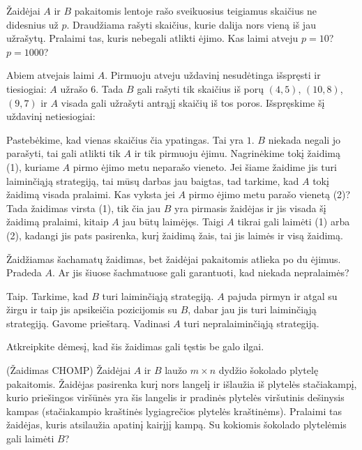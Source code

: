 \begin{pavnr}
  Žaidėjai $A$ ir $B$ pakaitomis lentoje rašo sveikuosius teigiamus skaičius
  ne didesnius už $p$. Draudžiama rašyti skaičius, kurie dalija nors vieną iš
  jau užrašytų. Pralaimi tas, kuris nebegali atlikti ėjimo. Kas laimi atveju
  $p=10$? $p=1000$?
\end{pavnr}

\begin{sprendimas}
  Abiem atvejais laimi $A$. Pirmuoju atveju uždavinį nesudėtinga išspręsti
  ir tiesiogiai: $A$ užrašo $6$. Tada $B$ gali rašyti tik skaičius iš porų
  $(4,5)$, $(10,8)$, $(9,7)$ ir $A$ visada gali užrašyti antrąjį skaičių iš
  tos poros. Išspręskime šį uždavinį netiesiogiai:

  Pastebėkime, kad vienas skaičius čia ypatingas. Tai yra
  $1$. $B$ niekada negali jo parašyti, tai gali atlikti tik $A$ ir tik
  pirmuoju ėjimu. Nagrinėkime tokį žaidimą (1), kuriame $A$ pirmo ėjimo metu
  neparašo vieneto. Jei šiame žaidime jis turi laiminčiąją strategiją, tai
  mūsų darbas jau baigtas, tad tarkime, kad $A$ tokį žaidimą visada pralaimi.
  Kas vyksta jei $A$ pirmo ėjimo metu parašo vienetą (2)? Tada žaidimas virsta
  (1), tik čia jau $B$ yra pirmasis žaidėjas ir jis visada šį žaidimą
  pralaimi, kitaip $A$ jau būtų laimėjęs. Taigi $A$ tikrai gali laimėti (1)
  arba (2), kadangi jis pats pasirenka, kurį žaidimą žais, tai jis laimės ir
  visą žaidimą. 
\end{sprendimas}

\begin{pavnr}
  Žaidžiamas šachamatų žaidimas, bet žaidėjai pakaitomis atlieka po du
  ėjimus. Pradeda $A$. Ar jis šiuose šachmatuose gali
  garantuoti, kad niekada nepralaimės? 
\end{pavnr}

\begin{sprendimas}
  Taip. Tarkime, kad $B$ turi laiminčiąją strategiją.
  $A$ pajuda pirmyn ir atgal su žirgu ir taip jis apsikeičia pozicijomis su
  $B$, dabar jau jis turi laiminčiąją strategiją. Gavome prieštarą. Vadinasi
  $A$ turi nepralaiminčiąją strategiją. 
\end{sprendimas}

\begin{pastaba}
  Atkreipkite dėmesį, kad šis žaidimas gali tęstis be galo ilgai.
\end{pastaba}

\begin{pavnr}{(Žaidimas CHOMP)}
  Žaidėjai $A$ ir $B$ laužo $m\times n$ dydžio šokolado plytelę pakaitomis.
  Žaidėjas pasirenka kurį nors langelį ir išlaužia iš plytelės stačiakampį,
  kurio priešingos viršūnės yra šis langelis ir pradinės plytelės
  viršutinis dešinysis kampas (stačiakampio kraštinės lygiagrečios plytelės
  kraštinėms).  Pralaimi tas žaidėjas, kuris atsilaužia apatinį kairįjį
  kampą. Su kokiomis šokolado plytelėmis gali laimėti $B$?
  \label{CHOMP}
\end{pavnr}

